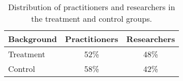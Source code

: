 \begin{table}[b]
\caption{Distribution of practitioners and researchers in the treatment and control groups.}
\label{table:background}
\centering
\begin{tabular}{lcc}
\toprule
\textbf{Background} & \textbf{Practitioners} & \textbf{Researchers} \\ 
\midrule
Treatment           & 52\%                   & 48\%                 \\
Control             & 58\%                   & 42\%                 \\ 
\bottomrule
\end{tabular}
\end{table}
